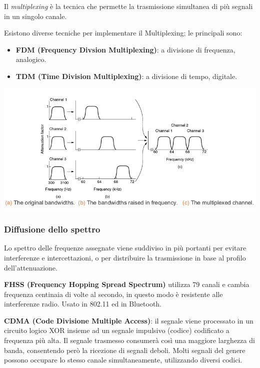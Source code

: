             Il \textit{multiplexing} è la tecnica che permette la trasmissione simultanea di più segnali in un singolo canale.

            Esistono diverse tecniche per implementare il Multiplexing; le principali sono:
            \begin{itemize}
                \item \textbf{FDM (Frequency Divsion Multiplexing)}: a divisione di frequenza, analogico.
                \item \textbf{TDM (Time Division Multiplexing)}: a divisione di tempo, digitale.
            \end{itemize}

            \begin{center}
                \includegraphics[scale=0.41]{chapters/2/assets/schema_e.png}
            \end{center}

        \subsubsection{Diffusione dello spettro}
            Lo spettro delle frequenze assegnate viene suddiviso in più portanti per evitare interferenze e intercettazioni, o per distribuire la trasmissione in base al profilo dell'attenuazione.

            \textbf{FHSS (Frequency Hopping Spread Spectrum)} utilizza 79 canali e cambia frequenza centinaia di volte al secondo, in questo modo è resistente alle interferenze radio. Usato in 802.11 ed in Bluetooth.

            \textbf{CDMA (Code Divisione Multiple Access)}: il segnale viene processato in un circuito logico XOR insieme ad un segnale impulsivo (codice) codificato a frequenza più alta. Il segnale trasmesso consumerà così una maggiore larghezza di banda, consentendo però la ricezione di segnali deboli. Molti segnali del genere possono occupare lo stesso canale simultaneamente, utilizzando diversi codici.

